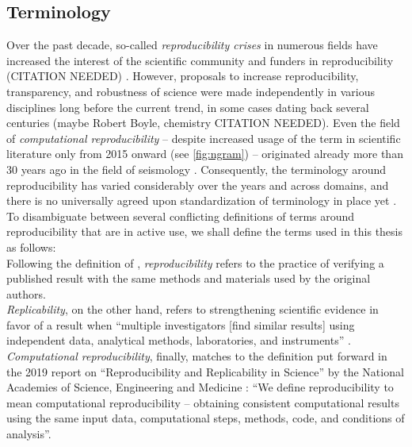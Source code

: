 \subsection{Terminology}

Over the past decade, so-called \textit{reproducibility crises} in numerous fields have increased the interest of the scientific community and funders in reproducibility (CITATION NEEDED) \citep{wagner202310}.
However, proposals to increase reproducibility, transparency, and robustness of science were made independently in various disciplines long before the current trend, in some cases dating back several centuries (maybe Robert Boyle, chemistry CITATION NEEDED).
Even the field of \textit{computational reproducibility} -- despite increased usage of the term in scientific literature only from 2015 onward (see \cref{fig:ngram}) -- originated already more than 30 years ago in the field of seismology \citep{claerbout1992electronic} \citep{buckheit1995wavelab}.
Consequently, the terminology around reproducibility has varied considerably over the years and across domains, and there is no universally agreed upon standardization of terminology in place yet \citep{barba2018terminologies}.
To disambiguate between several conflicting definitions of terms around reproducibility that are in active use, we shall define the terms used in this thesis as follows: \\
Following the definition of \citet{peng2006}, \textit{reproducibility} refers to the practice of verifying a published result with the same methods and materials used by the original authors. \\
\textit{Replicability}, on the other hand, refers to strengthening scientific evidence in favor of a result when ``multiple investigators [find similar results] using independent data, analytical methods, laboratories, and instruments''  \citep{peng2006}. \\
\textit{Computational reproducibility}, finally, matches to the definition put forward in the 2019 report on ``Reproducibility and Replicability in Science'' by the National Academies of Science, Engineering and Medicine \citep{engineering2019reproducibility}: ``We define reproducibility to mean computational reproducibility – obtaining consistent computational results using the same input data, computational steps, methods, code, and conditions of analysis''.


